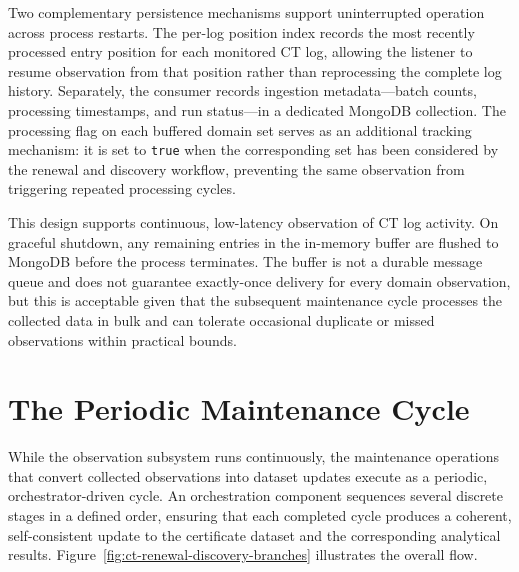 Two complementary persistence mechanisms support uninterrupted operation
across process restarts. The per-log position index records the most recently
processed entry position for each monitored CT log, allowing the listener to
resume observation from that position rather than reprocessing the complete
log history. Separately, the consumer records ingestion metadata---batch
counts, processing timestamps, and run status---in a dedicated MongoDB
collection. The processing flag on each buffered domain set serves as an
additional tracking mechanism: it is set to \texttt{true} when the
corresponding set has been considered by the renewal and discovery workflow,
preventing the same observation from triggering repeated processing
cycles.

This design supports continuous, low-latency observation of CT log activity.
On graceful shutdown, any remaining entries in the in-memory buffer are
flushed to MongoDB before the process terminates. The buffer is not a durable
message queue and does not guarantee exactly-once delivery for every domain
observation, but this is acceptable given that the subsequent maintenance
cycle processes the collected data in bulk and can tolerate occasional
duplicate or missed observations within practical bounds.

\section{The Periodic Maintenance Cycle}
\label{sec:eight-stage-orchestrator}

While the observation subsystem runs continuously, the maintenance operations
that convert collected observations into dataset updates execute as a
periodic, orchestrator-driven cycle. An orchestration component sequences
several discrete stages in a defined order, ensuring that each completed
cycle produces a coherent, self-consistent update to the certificate dataset
and the corresponding analytical results. Figure~\ref{fig:ct-renewal-discovery-branches}
illustrates the overall flow.

